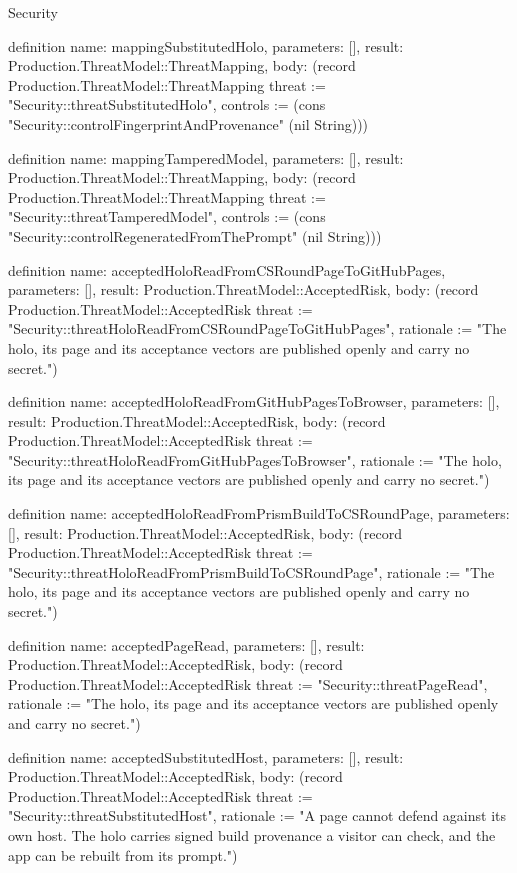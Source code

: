 \begin{lexlean}{Security}
\begin{semanticmodule}
definition{
  name: mappingSubstitutedHolo,
  parameters: [],
  result: Production.ThreatModel::ThreatMapping,
  body: (record Production.ThreatModel::ThreatMapping {threat := "Security::threatSubstitutedHolo", controls := (cons "Security::controlFingerprintAndProvenance" (nil String))})
}

definition{
  name: mappingTamperedModel,
  parameters: [],
  result: Production.ThreatModel::ThreatMapping,
  body: (record Production.ThreatModel::ThreatMapping {threat := "Security::threatTamperedModel", controls := (cons "Security::controlRegeneratedFromThePrompt" (nil String))})
}

definition{
  name: acceptedHoloReadFromCSRoundPageToGitHubPages,
  parameters: [],
  result: Production.ThreatModel::AcceptedRisk,
  body: (record Production.ThreatModel::AcceptedRisk {threat := "Security::threatHoloReadFromCSRoundPageToGitHubPages", rationale := "The holo, its page and its acceptance vectors are published openly and carry no secret."})
}

definition{
  name: acceptedHoloReadFromGitHubPagesToBrowser,
  parameters: [],
  result: Production.ThreatModel::AcceptedRisk,
  body: (record Production.ThreatModel::AcceptedRisk {threat := "Security::threatHoloReadFromGitHubPagesToBrowser", rationale := "The holo, its page and its acceptance vectors are published openly and carry no secret."})
}

definition{
  name: acceptedHoloReadFromPrismBuildToCSRoundPage,
  parameters: [],
  result: Production.ThreatModel::AcceptedRisk,
  body: (record Production.ThreatModel::AcceptedRisk {threat := "Security::threatHoloReadFromPrismBuildToCSRoundPage", rationale := "The holo, its page and its acceptance vectors are published openly and carry no secret."})
}

definition{
  name: acceptedPageRead,
  parameters: [],
  result: Production.ThreatModel::AcceptedRisk,
  body: (record Production.ThreatModel::AcceptedRisk {threat := "Security::threatPageRead", rationale := "The holo, its page and its acceptance vectors are published openly and carry no secret."})
}

definition{
  name: acceptedSubstitutedHost,
  parameters: [],
  result: Production.ThreatModel::AcceptedRisk,
  body: (record Production.ThreatModel::AcceptedRisk {threat := "Security::threatSubstitutedHost", rationale := "A page cannot defend against its own host. The holo carries signed build provenance a visitor can check, and the app can be rebuilt from its prompt."})
}


\end{semanticmodule}
\end{lexlean}
